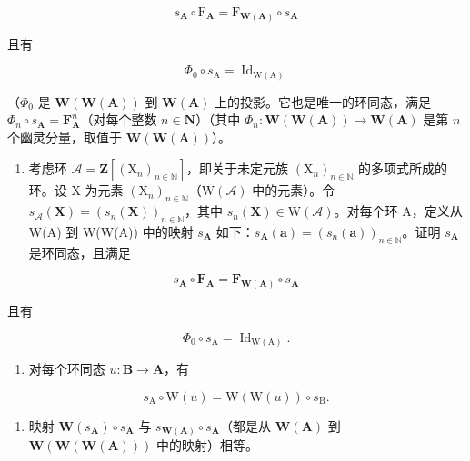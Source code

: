 \[
s _ {\mathbf {A}} \circ \mathrm{F} _ {\mathbf {A}} = \mathrm{F} _ {\mathbf {W} (\mathbf {A})} \circ s _ {\mathbf {A}}
\]

且有

\[
\Phi_ {0} \circ s _ {\mathrm{A}} = \operatorname{Id} _ {\mathrm{W(A)}}
\]

（\(\Phi_0\) 是 \(\mathbf{W}(\mathbf{W}(\mathbf{A}))\) 到 \(\mathbf{W}(\mathbf{A})\) 上的投影。它也是唯一的环同态，满足 \(\Phi_n\circ s_{\mathbf{A}} = \mathbf{F}_{\mathbf{A}}^{n}\)（对每个整数 \(n\in \mathbf{N}\)）（其中 \(\Phi_n:\mathbf{W}(\mathbf{W}(\mathbf{A}))\to \mathbf{W}(\mathbf{A})\) 是第 \(n\) 个幽灵分量，取值于 \(\mathbf{W}(\mathbf{W}(\mathbf{A}))\)）。

\begin{enumerate}
\def\labelenumi{\alph{enumi})}
\setcounter{enumi}{1}
\tightlist
\item
  考虑环 \(\mathcal{A} = \mathbf{Z}[(\mathrm{X}_n)_{n\in \mathbb{N}}]\)，即关于未定元族 \((\mathrm{X}_n)_{n\in \mathbb{N}}\) 的多项式所成的环。设 X 为元素 \((\mathrm{X}_n)_{n\in \mathbb{N}}\)（\(\mathrm{W}(\mathcal{A})\) 中的元素）。令 \(s_{\mathcal{A}}(\mathbf{X}) = (s_n(\mathbf{X}))_{n\in \mathbb{N}}\)，其中 \(s_n(\mathbf{X}) \in \mathrm{W}(\mathcal{A})\)。对每个环 A，定义从 W(A) 到 W(W(A)) 中的映射 \(s_{\mathbf{A}}\) 如下：\(s_{\mathbf{A}}(\boldsymbol{a}) = (s_{n}(\boldsymbol{a}))_{n \in \mathbb{N}}\)。证明 \(s_{\mathbf{A}}\) 是环同态，且满足
\end{enumerate}

\[
s _ {\mathbf {A}} \circ \mathbf {F} _ {\mathbf {A}} = \mathbf {F} _ {\mathbf {W} (\mathbf {A})} \circ s _ {\mathbf {A}}
\]

且有

\[
\Phi_ {0} \circ s _ {\mathrm{A}} = \operatorname{Id} _ {\mathrm{W(A)}}.
\]

\begin{enumerate}
\def\labelenumi{\alph{enumi})}
\setcounter{enumi}{2}
\tightlist
\item
  对每个环同态 \(u: \mathbf{B} \to \mathbf{A}\)，有
\end{enumerate}

\[
s _ {\mathrm{A}} \circ \mathrm{W} (u) = \mathrm{W} (\mathrm{W} (u)) \circ s _ {\mathrm{B}}.
\]

\begin{enumerate}
\def\labelenumi{\alph{enumi})}
\setcounter{enumi}{3}
\tightlist
\item
  映射 \(\mathbf{W}(s_{\mathbf{A}})\circ s_{\mathbf{A}}\) 与 \(s_{\mathbf{W(A)}}\circ s_{\mathbf{A}}\)（都是从 \(\mathbf{W}(\mathbf{A})\) 到 \(\mathbf{W}(\mathbf{W}(\mathbf{W}(\mathbf{A})))\) 中的映射）相等。
\end{enumerate}


